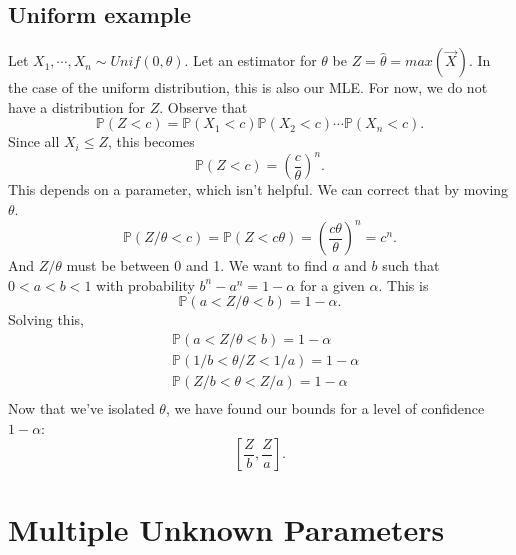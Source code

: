 \documentclass[titlepage, 12pt, leqno]{article}
\begin{document}
\subsection{Uniform example}
Let $X_{1}, \cdots ,X_{n} \sim Unif(0, \theta)$. Let an estimator for $\theta$
be $Z = \hat \theta = max(\vec X)$. In the case of the uniform distribution,
this is also our MLE. For now, we do not have a distribution for $Z$. Observe
that
\[
\mathbb{P}(Z < c) = \mathbb{P}(X_{1}<c) \mathbb{P}(X_{2}<c) \cdots 
\mathbb{P}(X_{n}<c).
\]
Since all $X_{i} \le Z$, this becomes
\[
\mathbb{P}(Z <c) = \left(\frac{c}{\theta}\right)^{n}.
\]
This depends on a parameter, which isn't helpful. We can correct that by 
moving $\theta$.
\[
\mathbb{P}(Z/\theta < c) = \mathbb{P}(Z < c\theta) = \left(\frac{c\theta}{\theta}
\right)^{n} = c^{n}.
\]
And $Z/\theta$ must be between 0 and 1. We want to find $a$ and $b$ such that
$0<a<b<1$ with probability $b^{n} - a^{n} = 1 - \alpha$ for a given
$\alpha$. This is
\[
\mathbb{P}(a < Z/\theta < b) = 1-\alpha.
\]
Solving this,
\begin{align*}
    &\mathbb{P}(a < Z/\theta < b) = 1- \alpha\\
    &\mathbb{P}(1/b < \theta/Z< 1/a) = 1 - \alpha\\
    &\mathbb{P}(Z/b < \theta < Z/a) = 1- \alpha \\
\end{align*}
Now that we've isolated $\theta$, we have found our bounds for a level of
confidence $1 - \alpha$:
\[
    \boxed{\left[\frac{Z}{b}, \frac{Z}{a}\right]} .
\]
\pagebreak
\section{Multiple Unknown Parameters}
\end{document}
